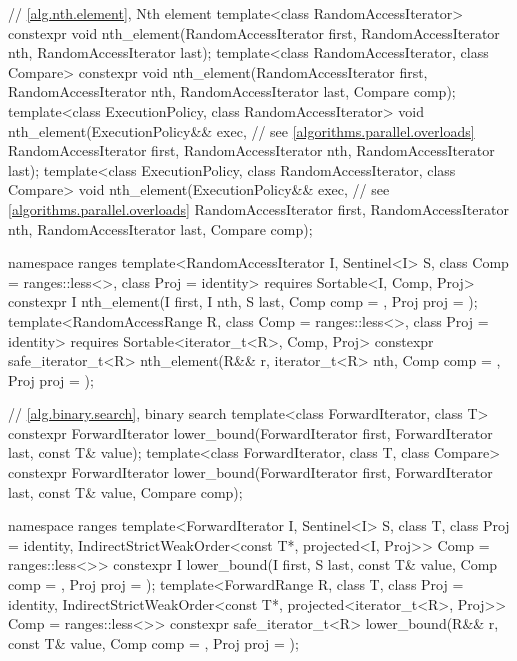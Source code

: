 \begin{codeblock}
{  // \ref{alg.nth.element}, Nth element
  template<class RandomAccessIterator>
    constexpr void nth_element(RandomAccessIterator first, RandomAccessIterator nth,
                               RandomAccessIterator last);
  template<class RandomAccessIterator, class Compare>
    constexpr void nth_element(RandomAccessIterator first, RandomAccessIterator nth,
                               RandomAccessIterator last, Compare comp);
  template<class ExecutionPolicy, class RandomAccessIterator>
    void nth_element(ExecutionPolicy&& exec, // see \ref{algorithms.parallel.overloads}
                     RandomAccessIterator first, RandomAccessIterator nth,
                     RandomAccessIterator last);
  template<class ExecutionPolicy, class RandomAccessIterator, class Compare>
    void nth_element(ExecutionPolicy&& exec, // see \ref{algorithms.parallel.overloads}
                     RandomAccessIterator first, RandomAccessIterator nth,
                     RandomAccessIterator last, Compare comp);

  namespace ranges {
    template<RandomAccessIterator I, Sentinel<I> S, class Comp = ranges::less<>,
        class Proj = identity>
      requires Sortable<I, Comp, Proj>
      constexpr I
        nth_element(I first, I nth, S last, Comp comp = {}, Proj proj = {});
    template<RandomAccessRange R, class Comp = ranges::less<>, class Proj = identity>
      requires Sortable<iterator_t<R>, Comp, Proj>
      constexpr safe_iterator_t<R>
        nth_element(R&& r, iterator_t<R> nth, Comp comp = {}, Proj proj = {});
  }

  // \ref{alg.binary.search}, binary search
  template<class ForwardIterator, class T>
    constexpr ForwardIterator
      lower_bound(ForwardIterator first, ForwardIterator last,
                  const T& value);
  template<class ForwardIterator, class T, class Compare>
    constexpr ForwardIterator
      lower_bound(ForwardIterator first, ForwardIterator last,
                  const T& value, Compare comp);

  namespace ranges {
    template<ForwardIterator I, Sentinel<I> S, class T, class Proj = identity,
        IndirectStrictWeakOrder<const T*, projected<I, Proj>> Comp = ranges::less<>>
      constexpr I lower_bound(I first, S last, const T& value, Comp comp = {},
                              Proj proj = {});
    template<ForwardRange R, class T, class Proj = identity,
        IndirectStrictWeakOrder<const T*, projected<iterator_t<R>, Proj>> Comp = ranges::less<>>
      constexpr safe_iterator_t<R>
        lower_bound(R&& r, const T& value, Comp comp = {}, Proj proj = {});
  }

}
\end{codeblock}
